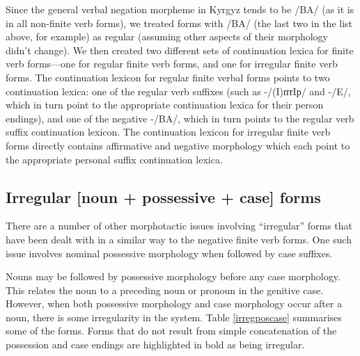 \documentclass[a4paper,12pt,onecolumn,oneside]{article}
\begin{document}

Since the general verbal negation morpheme in Kyrgyz tends to be /BA/ (as it is in all non-finite verb forms), we treated forms with /BA/ (the last two in the list above, for example) as regular (assuming other aspects of their morphology didn’t change).  We then created two different sets of continuation lexica for finite verb forms—one for regular finite verb forms, and one for irregular finite verb forms.  The continuation lexicon for regular finite verbal forms points to two continuation lexica: one of the regular verb suffixes (such as -/(I)птIр/ and -/E/, which in turn point to the appropriate continuation lexica for their person endings), and one of the negative -/BA/, which in turn points to the regular verb suffix continuation lexicon.  The continuation lexicon for irregular finite verb forms directly contains affirmative and negative morphology which each point to the appropriate personal suffix continuation lexica.

\subsection{Irregular [noun + possessive + case] forms}

There are a number of other morphotactic issues involving ``irregular'' forms that have been dealt with in a similar way to the negative finite verb forms.  One such issue involves nominal possessive morphology when followed by case suffixes.

Nouns may be followed by possessive morphology before any case morphology.  This relates the noun to a preceding noun or pronoun in the genitive case.  However, when both possessive morphology and case morphology occur after a noun, there is some irregularity in the system.  Table \ref{irregposcase} summarises some of the forms.  Forms that do not result from simple concatenation of the possession and case endings are highlighted in bold as being irregular.
\end{document}
